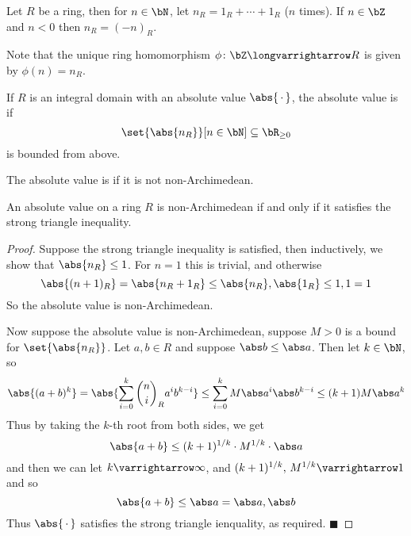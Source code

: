 \documentclass[10pt]{article}
\let\to=\varrightarrow
\let\longto=\longvarrightarrow
\def\qed{%
    \ifmmode%
        \eqno\blacksquare%
    \else%
        \hskip1cm\allowbreak\hbox{}\nobreak\hfill$\blacksquare$%
    \fi%
}
\begin{document}
\begin{defn*}

    Let $R$ be a ring, then for $n\in\bN$, let $n_R=1_R+\cdots+1_R$ ($n$ times).
    If $n\in\bZ$ and $n<0$ then $n_R=(-n)_R$.

\end{defn*}

Note that the unique ring homomorphism $\phi\colon\bZ\longto R$ is given by $\phi(n)=n_R$.

\begin{defn*}

    If $R$ is an integral domain with an absolute value $\abs{\,\cdot\,}$, the absolute value is  if
    \[ \set{\abs{n_R}}[n\in\bN] \subseteq \bR_{\geq0} \]
    is bounded from above.

    The absolute value is  if it is not non-Archimedean.

\end{defn*}

\begin{prop*}

    An absolute value on a ring $R$ is non-Archimedean if and only if it satisfies the strong triangle inequality.

\end{prop*}

\begin{proof}

    Suppose the strong triangle inequality is satisfied, then inductively, we show that $\abs{n_R}\leq1$.
    For $n=1$ this is trivial, and otherwise
    \[ \abs{(n+1)_R} = \abs{n_R + 1_R} \leq \maxof{\abs{n_R}, \abs{1_R}} \leq \maxof{1,1} = 1 \]
    So the absolute value is non-Archimedean.

    Now suppose the absolute value is non-Archimedean, suppose $M>0$ is a bound for $\set{\abs{n_R}}$.
    Let $a,b\in R$ and suppose $\abs b\leq\abs a$.
    Then let $k\in\bN$, so
    \[ \abs{(a+b)^k} = \abs{\sum_{i=0}^k\binom ni_R a^ib^{k-i}} \leq \sum_{i=0}^k M\abs a^i\abs b^{k-i} \leq (k+1)M\abs a^k \]
    Thus by taking the $k$-th root from both sides, we get
    \[ \abs{a+b} \leq (k+1)^{1/k}\cdot M^{1/k}\cdot\abs a \]
    and then we can let $k\to\infty$, and $(k+1)^{1/k},\,M^{1/k}\to1$ and so
    \[ \abs{a+b} \leq \abs a = \maxof{\abs a,\abs b} \]
    Thus $\abs{\,\cdot\,}$ satisfies the strong triangle ienquality, as required.
    \qed

\end{proof}
\end{document}
